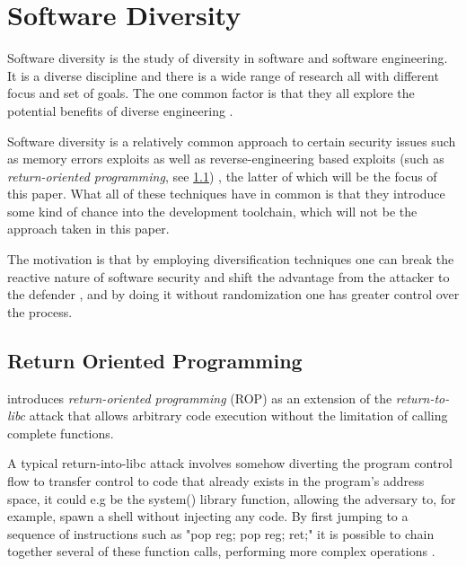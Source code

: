 \section{Software Diversity}

Software diversity is the study of diversity in software and software engineering. It is
a diverse discipline and there is a wide range of research all with different focus and
set of goals. The one common factor is that they all explore the potential benefits of
diverse engineering \cite{survey}.

Software diversity is a relatively common approach to certain security issues such as
memory errors exploits \cite{os-randomization,mem-exploits,add-obfuscation,compiler-generated-sw-div}
as well as reverse-engineering based exploits (such as \textit{return-oriented programming}, see \ref{rop})
\cite{SoK,binary-stirring,large-scale-automated,readactor,smashing-gadgets,synthetic-diversity,librando},
the latter of which will be the focus of this paper. What all of these techniques have in
common is that they introduce some kind of chance into the development toolchain, which
will not be the approach taken in this paper.

The motivation is that by employing diversification techniques one can break the
reactive nature of software security and shift the advantage from the attacker to the
defender \cite{compiler-generated-sw-div}, and by doing it without randomization one has
greater control over the process.

\subsection{Return Oriented Programming}
\label{rop}

\textcite{rop} introduces \textit{return-oriented programming} (ROP) as an extension of
the \textit{return-to-libc}\cite{return-into-libc} attack that allows arbitrary code
execution without the limitation of calling complete functions.

A typical return-into-libc attack involves somehow diverting the program control
flow to transfer control to code that already exists in the program's address space,
it could e.g be the system() library function, allowing the adversary to, for example, spawn
a shell without injecting any code. By first jumping to a sequence of instructions such as
"pop reg; pop reg; ret;" it is possible to chain together several of these function calls,
performing more complex operations \cite{non-exec-stack,advanced-return-into-libc}.

